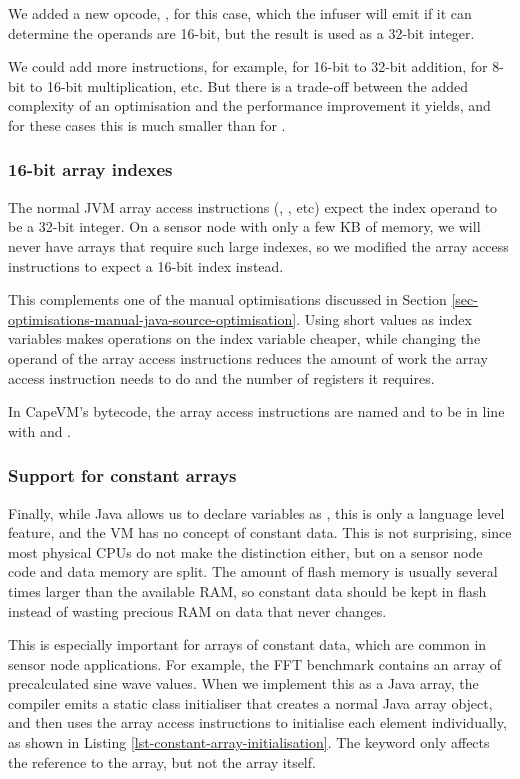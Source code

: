 We added a new opcode, , for this case, which the infuser will emit if it can determine the operands are 16-bit, but the result is used as a 32-bit integer.

We could add more instructions, for example,  for 16-bit to 32-bit addition,  for 8-bit to 16-bit multiplication, etc. But there is a trade-off between the added complexity of an optimisation and the performance improvement it yields, and for these cases this is much smaller than for .

\subsubsection{16-bit array indexes}
The normal JVM array access instructions (, , etc) expect the index operand to be a 32-bit integer. On a sensor node with only a few KB of memory, we will never have arrays that require such large indexes, so we modified the array access instructions to expect a 16-bit index instead. 

This complements one of the manual optimisations discussed in Section \ref{sec-optimisations-manual-java-source-optimisation}. Using short values as index variables makes operations on the index variable cheaper, while changing the operand of the array access instructions reduces the amount of work the array access instruction needs to do and the number of registers it requires.

In CapeVM's bytecode, the array access instructions are named  and  to be in line with  and .

\subsubsection{Support for constant arrays}
\label{sec-opt-constant-arrays}
Finally, while Java allows us to declare variables as , this is only a language level feature, and the VM has no concept of constant data. This is not surprising, since most physical CPUs do not make the distinction either, but on a sensor node code and data memory are split. The amount of flash memory is usually several times larger than the available RAM, so constant data should be kept in flash instead of wasting precious RAM on data that never changes.

This is especially important for arrays of constant data, which are common in sensor node applications. For example, the FFT benchmark contains an array of precalculated sine wave values. When we implement this as a  Java array, the compiler emits a static class initialiser that creates a normal Java array object, and then uses the array access instructions to initialise each element individually, as shown in Listing \ref{lst-constant-array-initialisation}. The  keyword only affects the reference to the  array, but not the array itself.

